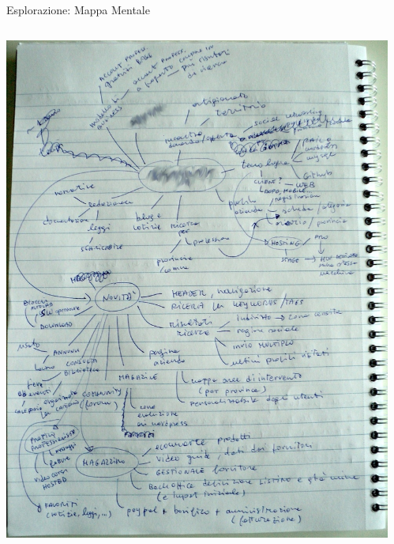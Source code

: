 	\begin{frame}{Esplorazione: Mappa Mentale}
		\begin{columns}[T]
		    \begin{column}{.5\textwidth}
				\includegraphics[scale=0.16]{images/mindmap-3}
		    \end{column}
		    \begin{column}{.5\textwidth}

\end{column}
\end{columns}
\end{frame}
